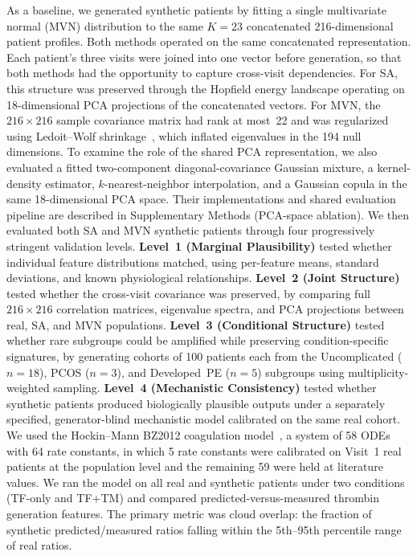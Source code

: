 As a baseline, we generated synthetic patients by fitting a single multivariate
normal (MVN) distribution to the same $K{=}23$ concatenated 216-dimensional patient
profiles. Both methods operated on the same concatenated
representation. Each patient's three visits were joined into one vector before
generation, so that both methods had the opportunity to capture cross-visit
dependencies. For SA, this structure was preserved through the Hopfield energy
landscape operating on 18-dimensional PCA projections of the concatenated vectors.
For MVN, the $216 \times 216$ sample covariance matrix had rank at most~22 and was
regularized using Ledoit--Wolf shrinkage~\citep{Ledoit2004}, which inflated
eigenvalues in the 194 null dimensions.
To examine the role of the shared PCA representation, we also evaluated a fitted
two-component diagonal-covariance Gaussian mixture, a kernel-density estimator,
$k$-nearest-neighbor interpolation, and a Gaussian copula in the same 18-dimensional PCA
space. Their implementations and shared evaluation pipeline are described in Supplementary
Methods (PCA-space ablation).
We then evaluated both SA and MVN synthetic patients through four progressively stringent
validation levels.
\textbf{Level~1 (Marginal Plausibility)} tested whether individual feature
distributions matched, using per-feature means, standard deviations, and known
physiological relationships. \textbf{Level~2 (Joint Structure)} tested whether the
cross-visit covariance was preserved, by comparing full $216 \times 216$ correlation
matrices, eigenvalue spectra, and PCA projections between real, SA, and MVN
populations. \textbf{Level~3 (Conditional Structure)} tested whether rare subgroups
could be amplified while preserving condition-specific signatures, by generating
cohorts of 100 patients each from the Uncomplicated ($n{=}18$), PCOS ($n{=}3$), and
Developed~PE ($n{=}5$) subgroups using multiplicity-weighted sampling. \textbf{Level~4 (Mechanistic
Consistency)} tested whether synthetic patients produced biologically plausible
outputs under a separately specified, generator-blind mechanistic model calibrated
on the same real cohort. We used the Hockin--Mann BZ2012
coagulation model~\citep{Hockin2002,BrummelZiedins2012}, a system of 58 ODEs with 64 rate
constants, in which 5 rate constants were calibrated on Visit~1 real patients at the
population level and the remaining 59 were held at literature values. We ran the model
on all real and synthetic patients under two conditions (TF-only and TF+TM) and
compared predicted-versus-measured thrombin generation features. The primary metric
was cloud overlap: the fraction of synthetic predicted/measured ratios falling
within the 5th--95th percentile range of real ratios.

